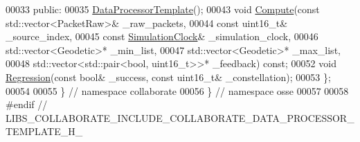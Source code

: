 \begin{DoxyCode}
00033  \textcolor{keyword}{public}:
00035   \hyperlink{classosse_1_1collaborate_1_1_data_processor_template_ad4b855d7eb850e218b367c87e481bcd7}{DataProcessorTemplate}();
00043   \textcolor{keywordtype}{void} \hyperlink{classosse_1_1collaborate_1_1_data_processor_template_a01a3532d55daf656a30232dab91e293e}{Compute}(\textcolor{keyword}{const} std::vector<PacketRaw>& \_raw\_packets,
00044                \textcolor{keyword}{const} uint16\_t& \_source\_index,
00045                \textcolor{keyword}{const} \hyperlink{classosse_1_1collaborate_1_1_simulation_clock}{SimulationClock}& \_simulation\_clock,
00046                std::vector<Geodetic>* \_min\_list,
00047                std::vector<Geodetic>* \_max\_list,
00048                std::vector<std::pair<bool, uint16\_t>>* \_feedback) \textcolor{keyword}{const};
00052   \textcolor{keywordtype}{void} \hyperlink{classosse_1_1collaborate_1_1_data_processor_template_a3cf1401b98a7e06852f3f46d464308ea}{Regression}(\textcolor{keyword}{const} \textcolor{keywordtype}{bool}& \_success, \textcolor{keyword}{const} uint16\_t& \_constellation);
00053 \};
00054 
00055 \}  \textcolor{comment}{// namespace collaborate}
00056 \}  \textcolor{comment}{// namespace osse}
00057 
00058 \textcolor{preprocessor}{#endif  // LIBS\_COLLABORATE\_INCLUDE\_COLLABORATE\_DATA\_PROCESSOR\_TEMPLATE\_H\_}
\end{DoxyCode}

